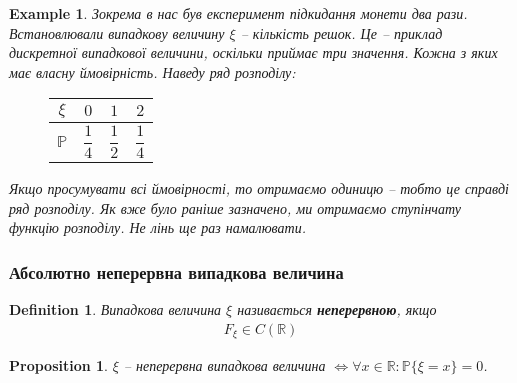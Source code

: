 \documentclass[a4paper, 10pt]{article}
\theoremstyle{theoremdd}
\newtheorem{definition}[theorem]{Definition}
\newtheorem{example}[theorem]{Example}
\newtheorem{proposition}[theorem]{Proposition}
\begin{document}
\begin{example}
Зокрема в нас був експеримент підкидання монети два рази. Встановлювали випадкову величину $\xi$ -- кількість решок. Це -- приклад дискретної випадкової величини, оскільки приймає три значення. Кожна з яких має власну ймовірність. Наведу ряд розподілу:
\begin{figure}[H]
\centering
\begin{tabular}{c|c|c|c}
$\xi$ & $0$ & $1$ & $2$ \\
\hline
$\mathbb{P}$ & $\dfrac{1}{4}$ & $\dfrac{1}{2}$ & $\dfrac{1}{4}$
\end{tabular}
\end{figure}
\noindent
Якщо просумувати всі ймовірності, то отримаємо одиницю -- тобто це справді ряд розподілу. Як вже було раніше зазначено, ми отримаємо ступінчату функцію розподілу. Не лінь ще раз намалювати.
\begin{figure}[H]
\centering
{}
\end{figure}
\end{example}

\subsubsection{Абсолютно неперервна випадкова величина}
\begin{definition}
Випадкова величина $\xi$ називається \textbf{неперервною}, якщо
\begin{align*}
F_\xi \in C(\mathbb{R})
\end{align*}
\end{definition}

\begin{proposition}
$\xi$ -- неперервна випадкова величина $\iff \forall x \in \mathbb{R}: \mathbb{P}\{\xi = x\} = 0$.
\end{proposition}
\end{document}
